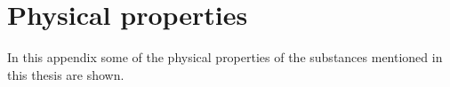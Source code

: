 \chapter{Physical properties}


In this appendix some of the physical properties of the substances mentioned in this thesis are shown.




















